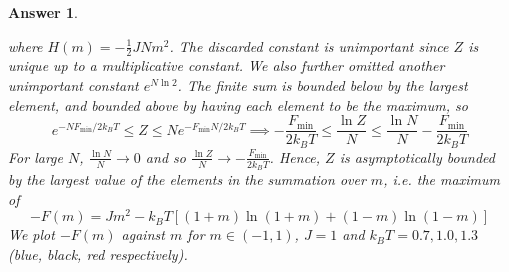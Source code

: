 \documentclass[a4paper]{article}
\newtheorem{ans}{Answer}[section]
\theoremstyle{new}
\begin{document}
\begin{ans}
\begin{enumerate}[label=(\alph*)]
where $H(m)=-\frac{1}{2}JNm^2$. The discarded constant is unimportant since $Z$ is unique up to a multiplicative constant. We also further omitted another unimportant constant $e^{N\ln 2}$. The finite sum is bounded below by the largest element, and bounded above by having each element to be the maximum, so
$$e^{-NF_{\text{min}}/2k_BT}\leq Z\leq Ne^{-F_{\text{min}}N/2k_BT}\implies-\frac{F_{\text{min}}}{2k_BT}\leq\frac{\ln Z}{N}\leq\frac{\ln N}{N}-\frac{F_{\text{min}}}{2k_BT}$$
For large $N$, $\frac{\ln N}{N}\rightarrow 0$ and so $\frac{\ln Z}{N}\rightarrow -\frac{F_{\text{min}}}{2k_BT}$. Hence, $Z$ is asymptotically bounded by the largest value of the elements in the summation over $m$, i.e. the maximum of 
$$-F(m)=Jm^2-k_BT[(1+m)\ln(1+m)+(1-m)\ln(1-m)]$$
We plot $-F(m)$ against $m$ for $m\in(-1,1)$, $J=1$ and $k_BT=0.7,1.0,1.3$ (blue, black, red respectively).
\begin{center}
\end{center}
\end{enumerate}
\end{ans}
\end{document}

